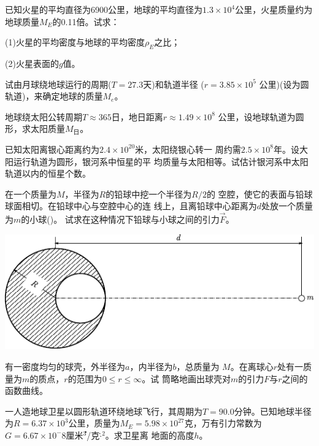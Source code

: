 \begin{exercises}
\exercise 已知火星的平均直径为6900公里，地球的平均直径为$ 1.3
\times 1 0 ^ { 4 }   $公里，火星质量约为地球质量$  M _ { E }   $的0.11倍。试求：

(1)火星的平均密度与地球的平均密度$ \rho _ E $之比；

(2)火星表面的$ g $值。

\exercise 试由月球绕地球运行的周期($  T = 2 7 . 3   $天)和轨道半径
($  r = 3 . 8 5 \times 1 0 ^ { 5 } $ 公里)(设为圆轨道)，来确定地球的质量$ M _ e $。

\exercise 地球绕太阳公转周期$  T \approx 3 6 5   $日，地日距离$  r \approx 1 . 4 9 \times 1 0 ^ { 8 }  $
公里，设地球轨道为圆形，求太阳质量$ M _ \text{日} $。

\exercise 已知太阳离银心距离约为$  2 . 4 \times 1 0 ^ { 2 0 }   $米，太阳绕银心转一
周约需$  2 . 5 \times 1 0 ^ { 8 }   $年。设大阳运行轨道为圆形，银河系中恒星的平
均质量与太阳相等。试估计银河系中太阳轨道以内的恒星个数。

\exercise 在一个质量为$ M $，半径为$ R $的铅球中挖一个半径为$ R/2 $的
空腔，使它的表面与铅球球面相切。在铅球中心与空腔中心的连
线上，且离铅球中心距离为$ d $处放一个质量为$ m $的小球()。
试求在这种情况下铅球与小球之间的引力$ \vec{F} $。
\begin{figurex}
    \centering
    \includegraphics{figure/fig04.12}
    \caption{}
    \label{fig:04.12}
\end{figurex}

\exercise 有一密度均匀的球壳，外半径为$ a $，内半径为$ b $，总质量为
$ M $。在离球心$ r $处有一质量为$ m $的质点，$ r $的范围为$  0 \leqslant r \leqslant \infty   $。试
筒略地画出球壳对$ m $的引力$ F $与$ r $之间的函数曲线。

\exercise 一人造地球卫星以圆形轨道环绕地球飞行，其周期为$  T =
90.0 $分钟。已知地球半径为$  R = 6. 3 7 \times 1 0 ^ { 3 }   $公里，质量为$  M _ { E } = 5 . 9 8
\times 1 0 ^ { 2 7 }   $克，万有引力常数为$  G = 6 . 6 7 \times 1 0 ^ { - }  8 $厘米\.$ ^3 $/克$ \cdot $\.$ ^2 $。求卫星离
地面的高度$ h $。


\end{exercises}
